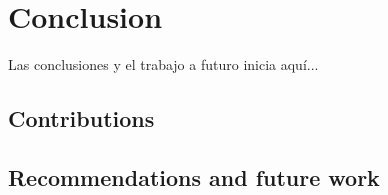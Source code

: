 
\chapter{Conclusion}

Las conclusiones y el trabajo a futuro inicia aqu\'i...

\section{Contributions}

\section{Recommendations and future work}

\clearpage